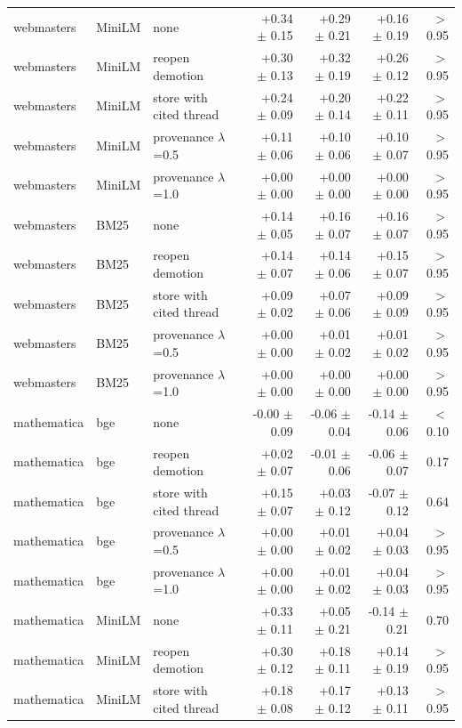 \begin{tabular}{lllrrrr}
\midrule
webmasters & MiniLM & none & +0.34 $\pm$ 0.15 & +0.29 $\pm$ 0.21 & +0.16 $\pm$ 0.19 & $>$0.95 \\
webmasters & MiniLM & reopen demotion & +0.30 $\pm$ 0.13 & +0.32 $\pm$ 0.19 & +0.26 $\pm$ 0.12 & $>$0.95 \\
webmasters & MiniLM & store with cited thread & +0.24 $\pm$ 0.09 & +0.20 $\pm$ 0.14 & +0.22 $\pm$ 0.11 & $>$0.95 \\
webmasters & MiniLM & provenance $\lambda$=0.5 & +0.11 $\pm$ 0.06 & +0.10 $\pm$ 0.06 & +0.10 $\pm$ 0.07 & $>$0.95 \\
webmasters & MiniLM & provenance $\lambda$=1.0 & +0.00 $\pm$ 0.00 & +0.00 $\pm$ 0.00 & +0.00 $\pm$ 0.00 & $>$0.95 \\
\midrule
webmasters & BM25 & none & +0.14 $\pm$ 0.05 & +0.16 $\pm$ 0.07 & +0.16 $\pm$ 0.07 & $>$0.95 \\
webmasters & BM25 & reopen demotion & +0.14 $\pm$ 0.07 & +0.14 $\pm$ 0.06 & +0.15 $\pm$ 0.07 & $>$0.95 \\
webmasters & BM25 & store with cited thread & +0.09 $\pm$ 0.02 & +0.07 $\pm$ 0.06 & +0.09 $\pm$ 0.09 & $>$0.95 \\
webmasters & BM25 & provenance $\lambda$=0.5 & +0.00 $\pm$ 0.00 & +0.01 $\pm$ 0.02 & +0.01 $\pm$ 0.02 & $>$0.95 \\
webmasters & BM25 & provenance $\lambda$=1.0 & +0.00 $\pm$ 0.00 & +0.00 $\pm$ 0.00 & +0.00 $\pm$ 0.00 & $>$0.95 \\
\midrule
mathematica & bge & none & -0.00 $\pm$ 0.09 & -0.06 $\pm$ 0.04 & -0.14 $\pm$ 0.06 & $<$0.10 \\
mathematica & bge & reopen demotion & +0.02 $\pm$ 0.07 & -0.01 $\pm$ 0.06 & -0.06 $\pm$ 0.07 & 0.17 \\
mathematica & bge & store with cited thread & +0.15 $\pm$ 0.07 & +0.03 $\pm$ 0.12 & -0.07 $\pm$ 0.12 & 0.64 \\
mathematica & bge & provenance $\lambda$=0.5 & +0.00 $\pm$ 0.00 & +0.01 $\pm$ 0.02 & +0.04 $\pm$ 0.03 & $>$0.95 \\
mathematica & bge & provenance $\lambda$=1.0 & +0.00 $\pm$ 0.00 & +0.01 $\pm$ 0.02 & +0.04 $\pm$ 0.03 & $>$0.95 \\
\midrule
mathematica & MiniLM & none & +0.33 $\pm$ 0.11 & +0.05 $\pm$ 0.21 & -0.14 $\pm$ 0.21 & 0.70 \\
mathematica & MiniLM & reopen demotion & +0.30 $\pm$ 0.12 & +0.18 $\pm$ 0.11 & +0.14 $\pm$ 0.19 & $>$0.95 \\
mathematica & MiniLM & store with cited thread & +0.18 $\pm$ 0.08 & +0.17 $\pm$ 0.12 & +0.13 $\pm$ 0.11 & $>$0.95 \\

\end{tabular}

